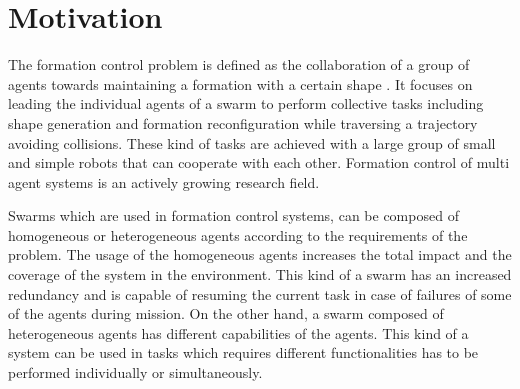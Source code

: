 \section{Motivation}
The formation control problem is defined as the collaboration of a group of agents towards maintaining a formation with a certain shape \cite{12}. It focuses on leading the individual agents of a swarm to perform  collective tasks including shape generation and formation reconfiguration while traversing a trajectory avoiding collisions. These kind of tasks are achieved with a large group of small and simple robots  that can cooperate with each other. Formation control of multi agent systems  is an actively growing research field.

Swarms which are used in formation control systems, can be composed of homogeneous or heterogeneous agents according to the requirements of the problem. The usage of the homogeneous agents increases the total impact and the coverage of the system in the environment. This kind of a swarm has an increased redundancy and is capable of resuming the current task in case of failures of some of the agents during mission. On the other hand, a swarm composed of heterogeneous agents has different capabilities of the agents. This kind of a system can be used in tasks which requires different functionalities has to be performed individually or simultaneously.

